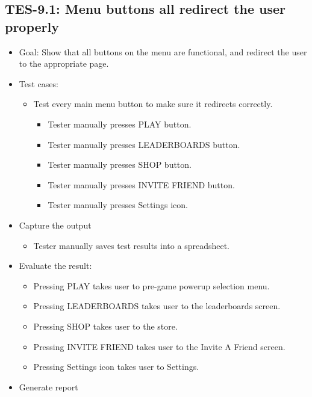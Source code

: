 \subsection{TES-9.1: Menu buttons all redirect the user properly }
\begin{itemize}
\item Goal: Show that all buttons on the menu are functional, and redirect the user to the appropriate page.
\item Test cases: 

\begin{itemize}
\item Test every main menu button to make sure it redirects correctly.

\begin{itemize}
\item Tester manually presses PLAY button.
\item Tester manually presses LEADERBOARDS button.
\item Tester manually presses SHOP button.
\item Tester manually presses INVITE FRIEND button.
\item Tester manually presses Settings icon.

\end{itemize}

\end{itemize}
\item Capture the output
\begin{itemize}
\item Tester manually saves test results into a spreadsheet.
\end{itemize}
\item Evaluate the result: 

\begin{itemize}
\item \label{select}
Pressing PLAY takes user to pre-game powerup selection menu.
\item Pressing LEADERBOARDS takes user to the leaderboards screen.
\item Pressing SHOP takes user to the store.
\item Pressing INVITE FRIEND takes user to the Invite A Friend screen.
\item Pressing Settings icon takes user to Settings.
\end{itemize}
\item Generate report
\end{itemize}

